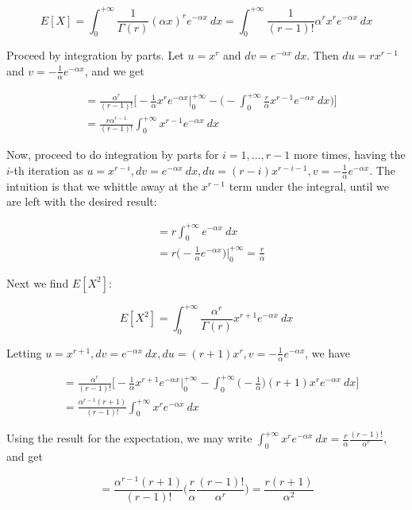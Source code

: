 \documentclass[10pt, oneside]{article}   	%
\theoremstyle{definition}
\begin{document}
\begin{enumerate}[label=9.\arabic*]
\[ E[X] = \int^{+\infty}_0 \frac{1}{\Gamma(r)} (\alpha x)^r e^{-\alpha x} \ dx = \int^{+\infty}_0 \frac{1}{(r-1)!} \alpha^r x^r e^{-\alpha x} \ dx \]

Proceed by integration by parts. Let $u = x^r$ and $dv = e^{-\alpha x} \ dx$. Then $du = rx^{r-1}$ and $v = -\frac{1}{\alpha} e^{-\alpha x}$, and we get

\begin{align*}
&= \frac{\alpha^r}{(r-1)!} \bigg[ -\frac{1}{\alpha} x^r e^{-\alpha x} \bigg|^{+\infty}_0 - \bigg( - \int^{+\infty}_0 \frac{r}{\alpha} x^{r-1} e^{-\alpha x} \ dx \bigg) \bigg] \\
&= \frac{r \alpha^{r-1}}{(r-1)!} \int^{+\infty}_0 x^{r-1} e^{-\alpha x} \ dx
\end{align*}

Now, proceed to do integration by parts for $i = 1, ..., r-1$ more times, having the $i$-th iteration as $u = x^{r-i}, dv = e^{-\alpha x} \ dx, du = (r-i)x^{r-i-1}, v = -\frac{1}{\alpha} e^{-\alpha x}$. The intuition is that we whittle away at the $x^{r-1}$ term under the integral, until we are left with the desired result:

\begin{align*}
&= r\int^{+\infty}_0 e^{-\alpha x} \ dx \\
&= r \bigg( -\frac{1}{\alpha} e^{-\alpha x} \bigg) \bigg|^{+\infty}_0 = \boxed{\frac{r}{\alpha}}
\end{align*}

Next we find $E[X^2]$:

\[ E[X^2] = \int^{+\infty}_0 \frac{\alpha^r}{\Gamma(r)} x^{r+1} e^{-\alpha x} \ dx \]

Letting $u = x^{r+1}, dv = e^{-\alpha x} \ dx, du = (r+1) x^r, v = -\frac{1}{\alpha} e^{-\alpha x}$, we have

\begin{align*}
&= \frac{\alpha^r}{(r-1)!} \bigg[ -\frac{1}{\alpha} x^{r+1} e^{-\alpha x} \bigg|^{+\infty}_0 - \int^{+\infty}_0 \bigg( -\frac{1}{\alpha} \bigg) (r+1) x^r e^{-\alpha x} \ dx \bigg] \\
&= \frac{\alpha^{r-1} (r+1)}{(r-1)!} \int^{+\infty}_0 x^r e^{-\alpha x} \ dx
\end{align*}

Using the result for the expectation, we may write $\int^{+\infty}_0 x^r e^{-\alpha x} \ dx = \frac{r}{\alpha} \frac{(r-1)!}{\alpha^r}$, and get

\[ = \frac{\alpha^{r-1} (r+1)}{(r-1)!} \bigg( \frac{r}{\alpha} \frac{(r-1)!}{\alpha^r} \bigg) = \frac{r(r+1)}{\alpha^2} \]


\end{enumerate}
\end{document}
